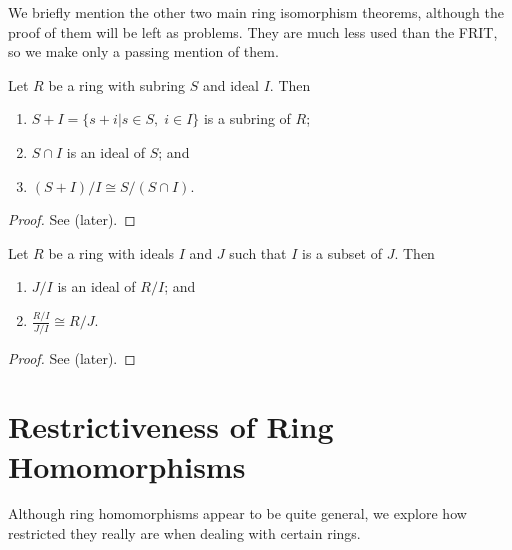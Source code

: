 We briefly mention the other two main ring isomorphism theorems, although the proof of them will be left as problems. They are much less used than the FRIT, so we make only a passing mention of them.

\newpage

\begin{theorem}\label{thrm-ring-isomorphism-2}
    Let $R$ be a ring with subring $S$ and ideal $I$. Then
    \begin{enumerate}
        \item $S+I = \{s+i \vert s\in S,\;i\in I\}$ is a subring of $R$;
        \item $S \cap I$ is an ideal of $S$; and
        \item $(S+I)/I \cong S/(S\cap I)$.
    \end{enumerate}
\end{theorem}
\begin{proof}
    See  (later).
\end{proof}

\begin{theorem}\label{thrm-ring-isomorphism-3}
    Let $R$ be a ring with ideals $I$ and $J$ such that $I$ is a subset of $J$. Then
    \begin{enumerate}
        \item $J/I$ is an ideal of $R/I$; and
        \item $\frac{R/I}{J/I} \cong R/J$.
    \end{enumerate}
\end{theorem}
\begin{proof}
    See  (later).
\end{proof}

\section{Restrictiveness of Ring Homomorphisms}
Although ring homomorphisms appear to be quite general, we explore how restricted they really are when dealing with certain rings.

